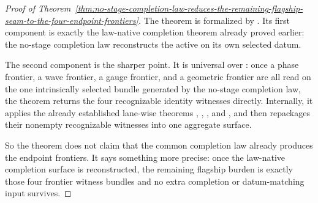 \begin{proof}[Proof of Theorem~\ref{thm:no-stage-completion-law-reduces-the-remaining-flagship-seam-to-the-four-endpoint-frontiers}]
\label{proof:thm:no-stage-completion-law-reduces-the-remaining-flagship-seam-to-the-four-endpoint-frontiers}
The theorem is formalized by
.
Its first component is exactly the law-native completion theorem already
proved earlier: the no-stage completion law reconstructs the active
 on its own selected datum.

The second component is the sharper point. It is universal over
: once a phase frontier, a wave
frontier, a gauge frontier, and a geometric frontier are all read on the one
intrinsically selected bundle generated by the no-stage completion law, the
theorem returns the four recognizable identity witnesses directly. Internally,
it applies the already established lane-wise theorems
,
,
, and
, and
then repackages their nonempty recognizable witnesses into one aggregate
surface.

So the theorem does not claim that the common completion law already produces
the endpoint frontiers. It says something more precise: once the law-native
completion surface is reconstructed, the remaining flagship burden is exactly
those four frontier witness bundles and no extra completion or datum-matching
input survives.
\end{proof}

